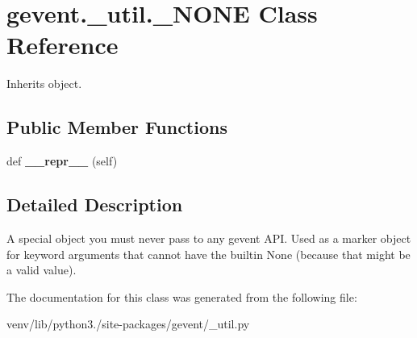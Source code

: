 \hypertarget{classgevent_1_1__util_1_1___n_o_n_e}{}\section{gevent.\+\_\+util.\+\_\+\+N\+O\+NE Class Reference}
\label{classgevent_1_1__util_1_1___n_o_n_e}


Inherits object.

\subsection*{Public Member Functions}
\begin{DoxyCompactItemize}
\item 
\mbox{\label{classgevent_1_1__util_1_1___n_o_n_e_ad58c2b9bfec4baab2084e9f720158fb8}} 
def {\bfseries \+\_\+\+\_\+repr\+\_\+\+\_\+} (self)
\end{DoxyCompactItemize}


\subsection{Detailed Description}
\begin{DoxyVerb}A special object you must never pass to any gevent API.
Used as a marker object for keyword arguments that cannot have the
builtin None (because that might be a valid value).
\end{DoxyVerb}
 

The documentation for this class was generated from the following file\+:\begin{DoxyCompactItemize}
\item 
venv/lib/python3./site-\/packages/gevent/\+\_\+util.\+py\end{DoxyCompactItemize}
